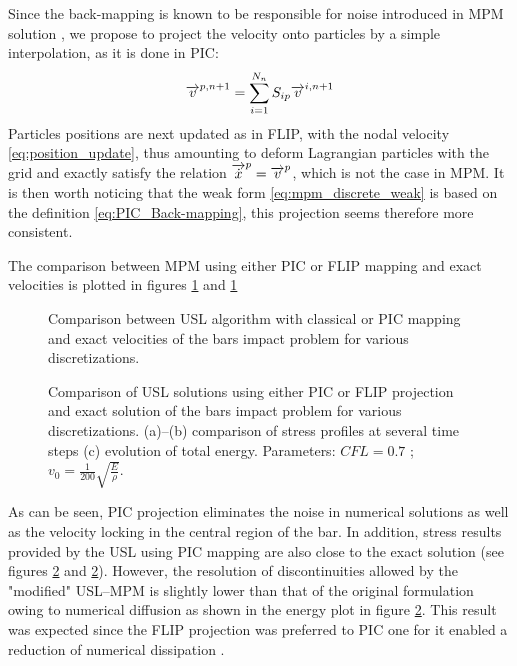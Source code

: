 Since the back-mapping is known to be responsible for noise introduced in MPM solution \cite{Mass_Flip}, we propose to project the velocity onto particles by a simple interpolation, as it is done in PIC:
\begin{equation}
  \label{eq:PIC_Back-mapping}
  {\overrightarrow{v}}^{p,n+1}=\sum_{i=1}^{N_n} S_{ip}{\overrightarrow{v}}^{i,n+1}
\end{equation}
Particles positions are next updated as in FLIP, with the nodal velocity \eqref{eq:position_update}, thus amounting to deform Lagrangian particles with the grid and exactly satisfy the relation ${\overrightarrow{\dot{x}}}^p={\overrightarrow{v}}^p$, which is not the case in MPM. It is then worth noticing that the weak form \eqref{eq:mpm_discrete_weak} is based on the definition \eqref{eq:PIC_Back-mapping}, this projection seems therefore more consistent.

The comparison between MPM using either PIC or FLIP mapping and exact velocities is plotted in figures \ref{fig:MPM_velocities} and \ref{fig:MPM_velocities}
\begin{figure}[h!]
  \centering
  { \label{subfig:MPM_velo_10}}
  { \label{subfig:MPM_velo_25}}
  \caption{Comparison between USL algorithm with classical or PIC mapping and exact velocities of the bars impact problem for various discretizations.}
  \label{fig:MPM_velocities}
\end{figure}
\begin{figure}[h!]
  \centering
  {  \label{subfig:mpm_diffusion_10}}
  {  \label{subfig:mpm_diffusion_25}}
  {  \label{subfig:mpm_energies}}
  \caption{Comparison of USL solutions using either PIC or FLIP projection and exact solution of the bars impact problem for various discretizations. (a)--(b) comparison of stress profiles at several time steps (c) evolution of total energy. Parameters: $CFL=0.7$ ; $v_0=\frac{1}{200}\sqrt{\frac{E}{\rho}}$.}
  \label{fig:mpm_diffusion}
\end{figure}
As can be seen, PIC projection eliminates the noise in numerical solutions as well as the velocity locking in the central region of the bar. In addition, stress results provided by the USL using PIC mapping are also close to the exact solution (see figures \ref{fig:mpm_diffusion} and \ref{fig:mpm_diffusion}). However, the resolution of discontinuities allowed by the "modified" USL--MPM is slightly lower than that of the original formulation owing to numerical diffusion as shown in the energy plot in figure \ref{fig:mpm_diffusion}. This result was expected since the FLIP projection was preferred to PIC one for it enabled a reduction of numerical dissipation \cite{PIC_Nishiguchi}.

